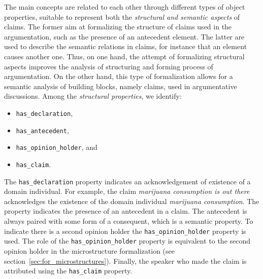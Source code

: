 The main concepts are related to each other through different types of object
properties, suitable to represent both the \emph{structural and semantic aspects} of
claims. The former aim at formalizing the structure of claims used in
the argumentation, such as the presence of an antecedent element. The latter
are used to describe the semantic relations in claims, for instance that
an element causes another one. Thus, on one hand, the attempt of 
formalizing structural aspects improves the analysis of structuring and
forming process of argumentation. On the other hand, this type of formalization
allows for a semantic analysis of building blocks, namely claims, used in 
argumentative discussions. Among the \emph{structural properties}, we identify:
\begin{itemize}
\item \texttt{has\_declaration}, 
\item \texttt{has\_antecedent},
\item \texttt{has\_opinion\_holder}, and
\item \texttt{has\_claim}. 
\end{itemize}
The \texttt{has\_declaration} property indicates an acknowledgement of
existence of a domain individual. For example, the claim 
\emph{marijuana consumption is out there} acknowledges
the existence of the domain individual \emph{marijuana consumption}.
The  property indicates the presence of an 
antecedent in a claim. The antecedent is always paired with some
form of a consequent, which is a semantic property. To indicate
there is a second opinion holder the \texttt{has\_opinion\_holder}
property is used. The role of the \texttt{has\_opinion\_holder}
property is equivalent to the second opinion holder in the microstructure
formalization (see section~\ref{sec:for_microstructures}). Finally, the speaker
who made the claim is attributed using the \texttt{has\_claim} property.

